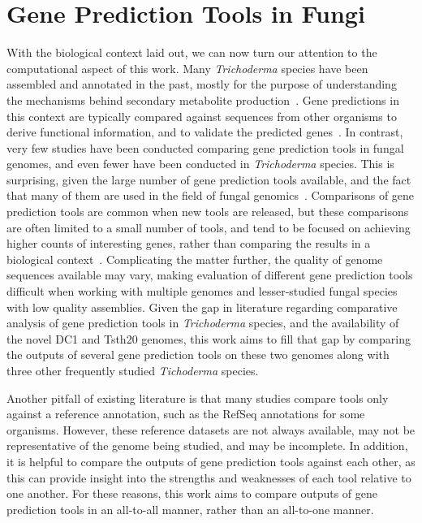 \section{Gene Prediction Tools in Fungi}
\label{lit:comp-motiv}
With the biological context laid out, we can now turn our attention to the computational aspect of this work. Many \textit{Trichoderma} species have been assembled and annotated in the past, mostly for the purpose of understanding the mechanisms behind secondary metabolite production~\cite{Mukherjee2012}. Gene predictions in this context are typically compared against sequences from other organisms to derive functional information, and to validate the predicted genes~\cite{loftus2003a}. In contrast, very few studies have been conducted comparing gene prediction tools in fungal genomes, and even fewer have been conducted in \textit{Trichoderma} species. This is surprising, given the large number of gene prediction tools available, and the fact that many of them are used in the field of fungal genomics~\cite{ejigu2020a}. Comparisons of gene prediction tools are common when new tools are released, but these comparisons are often limited to a small number of tools, and tend to be focused on achieving higher counts of interesting genes, rather than comparing the results in a biological context~\cite{min2017}. Complicating the matter further, the quality of genome sequences available may vary, making evaluation of different gene prediction tools difficult when working with multiple genomes and lesser-studied fungal species with low quality assemblies. Given the gap in literature regarding comparative analysis of gene prediction tools in \textit{Trichoderma} species, and the availability of the novel DC1 and Tsth20 genomes, this work aims to fill that gap by comparing the outputs of several gene prediction tools on these two genomes along with three other frequently studied \textit{Tichoderma} species. 

Another pitfall of existing literature is that many studies compare tools only against a reference annotation, such as the RefSeq annotations for some organisms. However, these reference datasets are not always available, may not be representative of the genome being studied, and may be incomplete. In addition, it is helpful to compare the outputs of gene prediction tools against each other, as this can provide insight into the strengths and weaknesses of each tool relative to one another. For these reasons, this work aims to compare outputs of gene prediction tools in an all-to-all manner, rather than an all-to-one manner.

